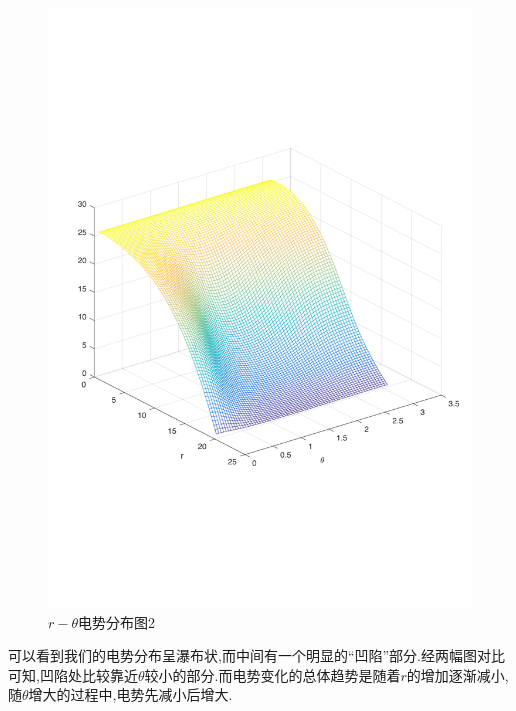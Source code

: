 \begin{figure}[htp]
    \centering
    \includegraphics[scale =0.50]{pic/2.pdf}
    \caption{$r-\theta$电势分布图2}
\end{figure}

可以看到我们的电势分布呈瀑布状,而中间有一个明显的“凹陷”部分.经两幅图对比可知,凹陷处比较靠近$\theta$较小的部分.而电势变化的总体趋势是随着$r$的增加逐渐减小, 随$\theta$增大的过程中,电势先减小后增大.

